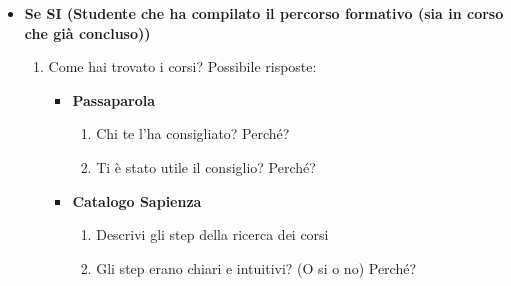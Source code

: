 \begin{itemize}
\begin{itemize}
\begin{itemize}
        \end{itemize}

        \item \textbf{Se SI (Studente che ha compilato il percorso formativo (sia in corso che già concluso))}
        \begin{enumerate}
            \item Come hai trovato i corsi? Possibile risposte:
            \begin{itemize}
                \item \textbf{Passaparola}
                \begin{enumerate}
                    \item Chi te l'ha consigliato? Perché?
                    \item Ti è stato utile il consiglio? Perché?
                \end{enumerate}

                \item \textbf{Catalogo Sapienza}
                \begin{enumerate}
                    \item Descrivi gli step della ricerca dei corsi
                    \item Gli step erano chiari e intuitivi? (O si o no) Perché?
                \end{enumerate}
            \end{itemize}


\end{enumerate}
\end{itemize}
\end{itemize}
